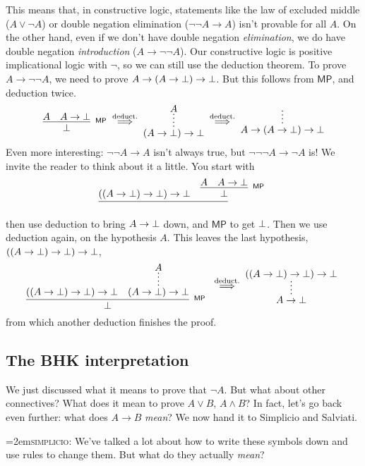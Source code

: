 \documentclass[11pt,paper=letter]{scrartcl}
\newcommand{\sf}{\mathsf}
\renewcommand{\land}{\wedge}
\renewcommand{\lor}{\vee}
\renewcommand{\lnot}{\neg}
\newcommand{\vc}[1]{\vcenter{\hbox{#1}}}
\newcommand{\simp}{\vspace{0.5em}\noindent\hangindent=2em\textsc{simplicio:} }
\begin{document}
This means that, in constructive logic, statements like the law of excluded middle ($A \lor \lnot A$) or double negation elimination ($\lnot \lnot A \to A$) isn't provable for all $A$. On the other hand, even if we don't have double negation \emph{elimination}, we do have double negation \emph{introduction} ($A \to \lnot\lnot A$). Our constructive logic is positive implicational logic with $\lnot$, so we can still use the deduction theorem. To prove $A \to \lnot\lnot A$, we need to prove $A \to (A \to \bot) \to \bot$. But this follows from $\sf{MP}$, and deduction twice.
\begin{align*}
\vc{\infer[^\sf{MP}]
{\false}
{A & A \to \false}}
\;\overset{\text{deduct.}}{\implies}\;
\vc{\infer*
{(A \to \false) \to \false}
{A}}
\;\overset{\text{deduct.}}{\implies}\;
\vc{\infer*
{A \to (A \to \false) \to \false}
{}}
\end{align*}
Even more interesting: $\lnot\lnot A \to A$ isn't always true, but $\lnot\lnot\lnot A \to \lnot A$ is! We invite the reader to think about it a little. You start with
\begin{align*}
\vc{\infer
{\phantom{\false}}
{
((A \to \false) \to \false) \to \false
&
\infer[^\sf{MP}]
{\false}
{A & A \to \false}
}
}
\end{align*}
then use deduction to bring $A \to \bot$ down, and $\sf{MP}$ to get $\bot$. Then we use deduction again, on the hypothesis $A$. This leaves the last hypothesis, $((A \to \bot) \to \bot) \to \bot$,
\begin{align*}
\vc{\infer[^\sf{MP}]
{\false}
{
((A \to \false) \to \false) \to \false
&
\infer*
{(A \to \false) \to \false}
{A}
}
}
\;\overset{\text{deduct.}}{\implies}\;
\vc{\infer*
{A \to \false}
{
((A \to \false) \to \false) \to \false
}
}
\end{align*}
from which another deduction finishes the proof.

\subsection{The BHK interpretation}

We just discussed what it means to prove that $\lnot A$. But what about other connectives? What does it mean to prove $A \lor B$, $A \land B$? In fact, let's go back even further: what does $A \to B$ \emph{mean}? We now hand it to Simplicio and Salviati.

\simp We've talked a lot about how to write these symbols down and use rules to change them. But what do they actually \emph{mean}?
\end{document}
